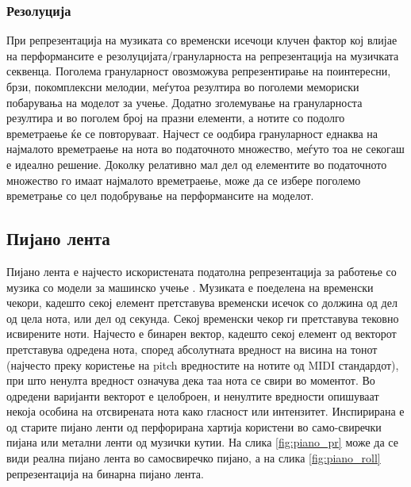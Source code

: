 \subsubsection{Резолуција}

При репрезентација на музиката со временски исечоци клучен фактор кој влијае на перформансите е резолуцијата/грануларноста на репрезентација на музичката секвенца. Поголема грануларност овозможува репрезентирање на поинтересни, брзи, покомплексни мелодии, меѓутоа резултира во поголеми мемориски побарувања на моделот за учење. Додатно зголемување на грануларноста резултира и во поголем број на празни елементи, а нотите со подолго времетраење ќе се повторуваат. Најчест се оодбира грануларност еднаква на најмалото времетраење на нота во податочното множество, меѓуто тоа не секогаш е идеално решение. Доколку релативно мал дел од елементите во податочното множество го имаат најмалото времетраење, може да се избере поголемо времетрање со цел подобрување на перформансите на моделот.

\subsection{Пијано лента}

Пијано лента е најчесто искористената податолна репрезентација за работење со музика со модели за машинско учење \cite{Hadjeres2016,Boulanger-Lewandowski2012,Boulanger-Lewandowski2014,Eck2002,Eck2008,Walder2016,Dong2017,Dong2018}. Музиката е поеделена на временски чекори, кадешто секој елемент претставува временски исечок со должина од дел од цела нота, или дел од секунда. Секој временски чекор ги претставува тековно исвирените ноти. Најчесто е бинарен вектор, кадешто секој елемент од векторот претставува одредена нота, според абсолутната вредност на висина на тонот (најчесто преку користење на pitch вредностите на нотите од MIDI стандардот), при што ненулта вредност означува дека таа нота се свири во моментот. Во одредени варијанти векторот е целоброен, и ненултите вредности опишуваат некоја особина на отсвирената нота како гласност или интензитет. Инспирирана е од старите пијано ленти од перфорирана хартија користени во само-свиречки пијана или метални ленти од музички кутии. На слика \ref{fig:piano_pr} може да се види реална пијано лента во самосвиречко пијано, а на слика \ref{fig:piano_roll} репрезентација на бинарна пијано лента.


